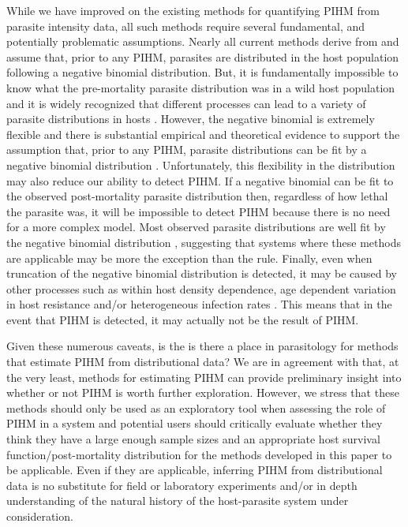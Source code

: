 \documentclass[12pt, a4paper]{article}
\begin{document}
While we have improved on the existing methods for quantifying
PIHM from parasite intensity data, all such methods require several
fundamental, and potentially problematic assumptions.  Nearly all current methods derive from \cite{Crofton1971a} \citep[but see][]{Ferguson2011} and assume that, prior to any PIHM, parasites are distributed in the host population following a
negative binomial distribution. But, it is fundamentally impossible to know
what the pre-mortality parasite distribution was in a wild host population and
it is widely recognized that different processes can lead to a variety of
parasite distributions in hosts \citep{Anderson1982a, Duerr2003}. However, the negative binomial is extremely
flexible and there is substantial empirical and theoretical evidence to support
the assumption that, prior to any PIHM, parasite distributions can be fit by a negative binomial distribution \citep{Shaw1995,Shaw1998,Wilson2002}. Unfortunately, this
flexibility in the distribution may also reduce our ability to detect PIHM. If
a negative binomial can be fit to the observed post-mortality parasite
distribution then, regardless of how lethal the parasite was, it will be
impossible to detect PIHM because there is no need for a more complex model.
Most observed parasite distributions are well fit by the negative binomial distribution \citep{Shaw1998}, suggesting
that systems where these methods are applicable may be more the exception than
the rule.  Finally, even when truncation of the negative binomial distribution is detected, it may be caused by other
processes such as within host density dependence, age dependent variation in host
resistance and/or heterogeneous infection rates \citep{McCallum2000a,Anderson1982a,Rousset1996}.  This means that in the event
that PIHM is detected, it may actually not be the result of PIHM.

Given these numerous caveats, is the is there a place in parasitology for methods that
estimate PIHM from distributional data?  We are in agreement with
\cite{Lester1984} that, at the very least, methods for estimating PIHM can
provide preliminary insight into whether or not PIHM is worth further
exploration.  However, we stress that these methods should only be used as an
exploratory tool when assessing the role of PIHM in a system and potential
users should critically evaluate whether they think they have a large enough
sample sizes and an appropriate host survival function/post-mortality distribution for the methods developed
in this paper to be applicable.  Even if they are applicable, inferring PIHM
from distributional data is no substitute for field or laboratory experiments
and/or in depth understanding of the natural history of the host-parasite
system under consideration.
\end{document}
